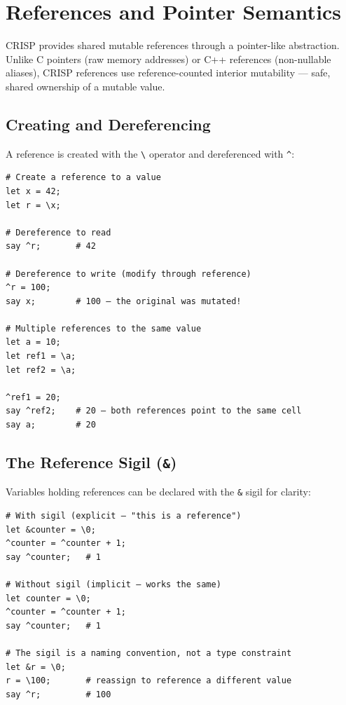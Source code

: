 \section{References and Pointer Semantics}

CRISP provides shared mutable references through a pointer-like abstraction. Unlike C pointers (raw memory addresses) or C++ references (non-nullable aliases), CRISP references use reference-counted interior mutability — safe, shared ownership of a mutable value.

\subsection{Creating and Dereferencing}

A reference is created with the \texttt{\textbackslash} operator and dereferenced with \texttt{\textasciicircum}:

\begin{tcolorbox}[colback=codebg, colframe=darkpurple, colbacktitle=darkpurple, title=\textbf{\textcolor{codegold}{Creating and Dereferencing}}, fonttitle=\bfseries, sharp corners]
\begin{lstlisting}
# Create a reference to a value
let x = 42;
let r = \x;

# Dereference to read
say ^r;       # 42

# Dereference to write (modify through reference)
^r = 100;
say x;        # 100 — the original was mutated!

# Multiple references to the same value
let a = 10;
let ref1 = \a;
let ref2 = \a;

^ref1 = 20;
say ^ref2;    # 20 — both references point to the same cell
say a;        # 20
\end{lstlisting}
\end{tcolorbox}

\subsection{The Reference Sigil (\texttt{\&})}

Variables holding references can be declared with the \texttt{\&} sigil for clarity:

\begin{tcolorbox}[colback=codebg, colframe=darkpurple, colbacktitle=darkpurple, title=\textbf{\textcolor{codegold}{Reference Sigil}}, fonttitle=\bfseries, sharp corners]
\begin{lstlisting}
# With sigil (explicit — "this is a reference")
let &counter = \0;
^counter = ^counter + 1;
say ^counter;   # 1

# Without sigil (implicit — works the same)
let counter = \0;
^counter = ^counter + 1;
say ^counter;   # 1

# The sigil is a naming convention, not a type constraint
let &r = \0;
r = \100;       # reassign to reference a different value
say ^r;         # 100
\end{lstlisting}
\end{tcolorbox}

